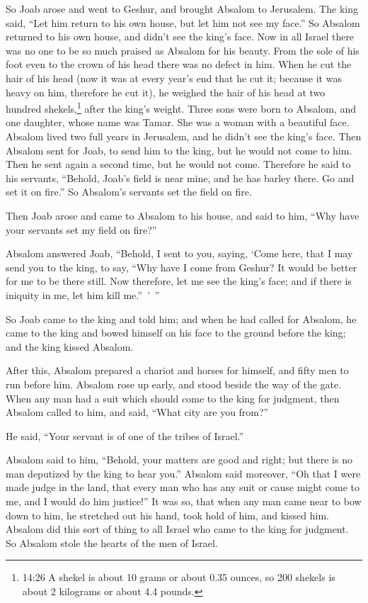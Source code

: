 \myverse{}So Joab arose and went to Geshur, and brought Absalom to Jerusalem.
\myverse{}The king said, “Let him return to his own house, but let him not see my face.”
So Absalom returned to his own house, and didn’t see the king’s face.
\myverse{}Now in all Israel there was no one to be so much praised as Absalom for his
beauty. From the sole of his foot even to the crown of his head there was no defect in him.
\myverse{}When he cut the hair of his head (now it was at every year’s end that he
cut it; because it was heavy on him, therefore he cut it), he weighed the hair of his head at two hundred
shekels,\footnote{14:26 A shekel is about 10 grams or about 0.35 ounces, so 200 shekels is about 2 kilograms or about
	4.4 pounds.} after the king’s weight.
\myverse{}Three sons were born to Absalom, and one daughter, whose name was Tamar.
She was a woman with a beautiful face.
\myverse{}Absalom lived two full years in Jerusalem, and he didn’t see the king’s face.
\myverse{}Then Absalom sent for Joab, to send him to the king, but he would not come
to him. Then he sent again a second time, but he would not come.
\myverse{}Therefore he said to his servants, “Behold, Joab’s field is near mine, and
he has barley there. Go and set it on fire.” So Absalom’s servants set the field on fire.

\myverse{}Then Joab arose and came to Absalom to his house, and said to
him, “Why have your servants set my field on fire?”

\myverse{}Absalom answered Joab, “Behold, I sent to you, saying, ‘Come
here, that I may send you to the king, to say, “Why have I come from Geshur? It would be better for me
to be there still. Now therefore, let me see the king’s face; and if there is iniquity in me, let him
kill me.” ’ ”

\myverse{}So Joab came to the king and told him; and when he had called
for Absalom, he came to the king and bowed himself on his face to the ground before the king; and the
king kissed Absalom.


\mychapter{} \myverse*{}After this, Absalom prepared a chariot and horses for himself,
and fifty men to run before him.
\myverse{}Absalom rose up early, and stood beside the way of the gate. When any man had
a suit which should come to the king for judgment, then Absalom called to him, and said, “What city are
you from?”

He said, “Your servant is of one of the tribes of Israel.”

\myverse{}Absalom said to him, “Behold, your matters are good and right;
but there is no man deputized by the king to hear you.”
\myverse{}Absalom said moreover, “Oh that I were made judge in the land, that every man
who has any suit or cause might come to me, and I would do him justice!”
\myverse{}It was so, that when any man came near to bow down to him, he stretched out
his hand, took hold of him, and kissed him.
\myverse{}Absalom did this sort of thing to all Israel who came to the king for judgment.
So Absalom stole the hearts of the men of Israel.

